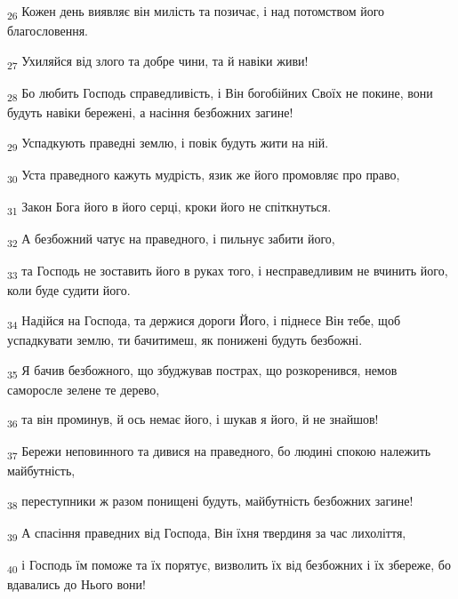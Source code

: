 \begin{tcolorbox}
\textsubscript{26} Кожен день виявляє він милість та позичає, і над потомством його благословення.
\end{tcolorbox}
\begin{tcolorbox}
\textsubscript{27} Ухиляйся від злого та добре чини, та й навіки живи!
\end{tcolorbox}
\begin{tcolorbox}
\textsubscript{28} Бо любить Господь справедливість, і Він богобійних Своїх не покине, вони будуть навіки бережені, а насіння безбожних загине!
\end{tcolorbox}
\begin{tcolorbox}
\textsubscript{29} Успадкують праведні землю, і повік будуть жити на ній.
\end{tcolorbox}
\begin{tcolorbox}
\textsubscript{30} Уста праведного кажуть мудрість, язик же його промовляє про право,
\end{tcolorbox}
\begin{tcolorbox}
\textsubscript{31} Закон Бога його в його серці, кроки його не спіткнуться.
\end{tcolorbox}
\begin{tcolorbox}
\textsubscript{32} А безбожний чатує на праведного, і пильнує забити його,
\end{tcolorbox}
\begin{tcolorbox}
\textsubscript{33} та Господь не зоставить його в руках того, і несправедливим не вчинить його, коли буде судити його.
\end{tcolorbox}
\begin{tcolorbox}
\textsubscript{34} Надійся на Господа, та держися дороги Його, і піднесе Він тебе, щоб успадкувати землю, ти бачитимеш, як понижені будуть безбожні.
\end{tcolorbox}
\begin{tcolorbox}
\textsubscript{35} Я бачив безбожного, що збуджував пострах, що розкоренився, немов саморосле зелене те дерево,
\end{tcolorbox}
\begin{tcolorbox}
\textsubscript{36} та він проминув, й ось немає його, і шукав я його, й не знайшов!
\end{tcolorbox}
\begin{tcolorbox}
\textsubscript{37} Бережи неповинного та дивися на праведного, бо людині спокою належить майбутність,
\end{tcolorbox}
\begin{tcolorbox}
\textsubscript{38} переступники ж разом понищені будуть, майбутність безбожних загине!
\end{tcolorbox}
\begin{tcolorbox}
\textsubscript{39} А спасіння праведних від Господа, Він їхня твердиня за час лихоліття,
\end{tcolorbox}
\begin{tcolorbox}
\textsubscript{40} і Господь їм поможе та їх порятує, визволить їх від безбожних і їх збереже, бо вдавались до Нього вони!
\end{tcolorbox}
